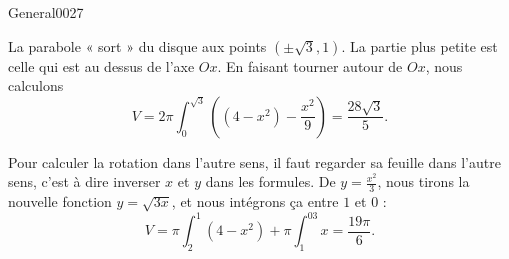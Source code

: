 \begin{corrige}{General0027}

La parabole « sort » du disque aux points $(\pm\sqrt{3},1)$. La partie plus petite est celle qui est au dessus de l'axe $Ox$. En faisant tourner autour de $Ox$, nous calculons 
\begin{equation}
	V=2\pi\int_{0}^{\sqrt{3}}\left( (4-x^2)-\frac{ x^2 }{ 9 } \right)=\frac{ 28\sqrt{3} }{ 5 }.
\end{equation}

Pour calculer la rotation dans l'autre sens, il faut regarder sa feuille dans l'autre sens, c'est à dire inverser $x$ et $y$ dans les formules. De $y=\frac{ x^2 }{ 3 }$, nous tirons la nouvelle fonction $y=\sqrt{3x}$, et nous intégrons ça entre $1$ et $0$ :
\begin{equation}
	V=\pi\int_2^1(4-x^2)+\pi\int_1^03x=\frac{ 19\pi }{ 6 }.
\end{equation}

\end{corrige}
